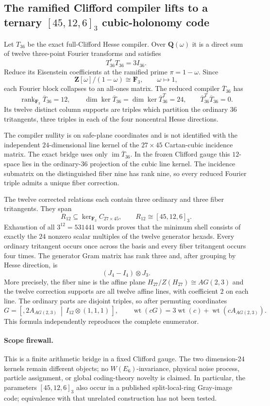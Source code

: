 \subsection*{The ramified Clifford compiler lifts to a ternary $[45,12,6]_3$ cubic-holonomy code}

Let $T_{36}$ be the exact full-Clifford Hesse compiler.  Over
$\mathbf Q(\omega)$ it is a direct sum of twelve three-point Fourier
transforms and satisfies
\[
 T_{36}^{*}T_{36}=3I_{36}.
\]
Reduce its Eisenstein coefficients at the ramified prime
$\pi=1-\omega$.  Since
\[
 \mathbf Z[\omega]/(1-\omega)\cong\mathbf F_3,
 \qquad \omega\longmapsto1,
\]
each Fourier block collapses to an all-ones matrix.  The reduced compiler
$\overline T_{36}$ has
\[
 \operatorname{rank}_{\mathbf F_3}\overline T_{36}=12,
 \qquad
 \dim\ker\overline T_{36}
 =\dim\ker\overline T_{36}^{T}=24,
 \qquad
 \overline T_{36}^{T}\overline T_{36}=0.
\]
Its twelve distinct column supports are triples which partition the ordinary
$36$ tritangents, three triples in each of the four noncentral Hesse
directions.

The compiler nullity is on safe-plane coordinates and is not identified with
the independent $24$-dimensional line kernel of the $27\times45$ Cartan-cubic
incidence matrix.  The exact bridge uses only
$\operatorname{im}\overline T_{36}$.  In the frozen Clifford gauge this
$12$-space lies in the ordinary-$36$ projection of the cubic line kernel.
The incidence submatrix on the distinguished fiber nine has rank nine, so
every reduced Fourier triple admits a unique fiber correction.

The twelve corrected relations each contain three ordinary and three fiber
tritangents.  They span
\[
 \boxed{R_{12}\subseteq\ker_{\mathbf F_3}C_{27\times45},
 \qquad R_{12}\cong[45,12,6]_3.}
\]
Exhaustion of all $3^{12}=531441$ words proves that the minimum shell consists
of exactly the $24$ nonzero scalar multiples of the twelve generator hexads.
Every ordinary tritangent occurs once across the basis and every fiber
tritangent occurs four times.  The generator Gram matrix has rank three and,
after grouping by Hesse direction, is
\[
 (J_4-I_4)\otimes J_3.
\]
More precisely, the fiber nine is the affine plane
$H_{27}/Z(H_{27})\cong AG(2,3)$ and the twelve correction supports are all
twelve affine lines, with coefficient $2$ on each line.  The ordinary parts
are disjoint triples, so after permuting coordinates
\[
 G=\left[,2A_{AG(2,3)}\ \middle|\
 I_{12}\otimes(1,1,1)\,\right],
 \qquad
 \operatorname{wt}(cG)=3\operatorname{wt}(c)
 +\operatorname{wt}(cA_{AG(2,3)}).
\]
This formula independently reproduces the complete enumerator.

\paragraph{Scope firewall.}
This is a finite arithmetic bridge in a fixed Clifford gauge.  The two
dimension-$24$ kernels remain different objects; no $W(E_6)$-invariance,
physical noise process, particle assignment, or global coding-theory novelty
is claimed.  In particular, the parameters $[45,12,6]_3$ also occur in a
published split-local-ring Gray-image code; equivalence with that unrelated
construction has not been tested.
